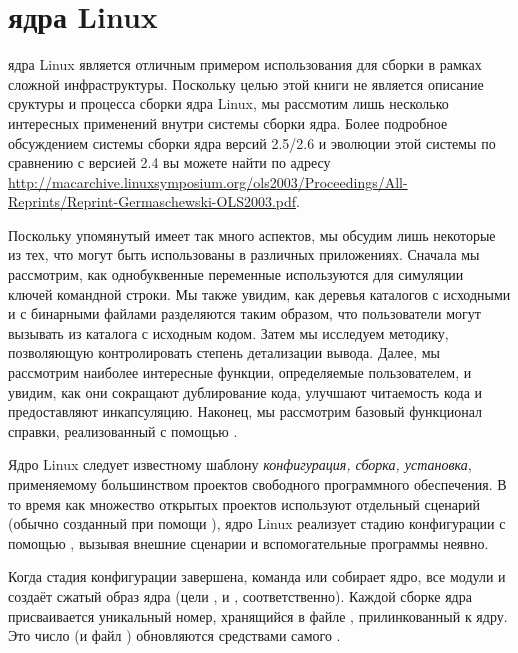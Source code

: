 \section{\Makefile{} ядра Linux}

\Makefile{} ядра Linux является отличным примером использования
\GNUmake{} для сборки в рамках сложной инфраструктуры. Поскольку целью
этой книги не является описание сруктуры и процесса сборки ядра Linux,
мы рассмотим лишь несколько интересных применений \GNUmake{} внутри
системы сборки ядра. Более подробное обсуждением системы сборки ядра
версий 2.5/2.6 и эволюции этой системы по сравнению с версией 2.4 вы
можете найти по адресу
\url{http://macarchive.linuxsymposium.org/ols2003/Proceedings/All-Reprints/Reprint-Germaschewski-OLS2003.pdf}.

Поскольку упомянутый \Makefile{} имеет так много аспектов, мы обсудим
лишь некоторые из тех, что могут быть использованы в различных
приложениях. Сначала мы рассмотрим, как однобуквенные переменные
\GNUmake{} используются для симуляции ключей командной строки. Мы
также увидим, как деревья каталогов с исходными и с бинарными файлами
разделяются таким образом, что пользователи могут вызывать \GNUmake{}
из каталога с исходным кодом. Затем мы исследуем методику, позволяющую
 контролировать степень детализации вывода. Далее, мы
рассмотрим наиболее интересные функции, определяемые пользователем, и
увидим, как они сокращают дублирование кода, улучшают читаемость кода
и предоставляют инкапсуляцию. Наконец, мы рассмотрим базовый
функционал справки, реализованный с помощью \GNUmake{}.

Ядро Linux следует известному шаблону \textit{конфигурация, сборка,
  установка}, применяемому большинством проектов свободного
программного обеспечения. В то время как множество открытых проектов
используют отдельный сценарий  (обычно
созданный при помощи ), ядро Linux реализует стадию
конфигурации с помощью \GNUmake{}, вызывая внешние сценарии и
вспомогательные программы неявно.

Когда стадия конфигурации завершена, команда  или
 собирает ядро, все модули и создаёт сжатый образ
ядра (цели ,  и
, соответственно). Каждой сборке ядра присваивается
уникальный номер, хранящийся в файле ,
прилинкованный к ядру. Это число (и файл )
обновляются средствами самого .

